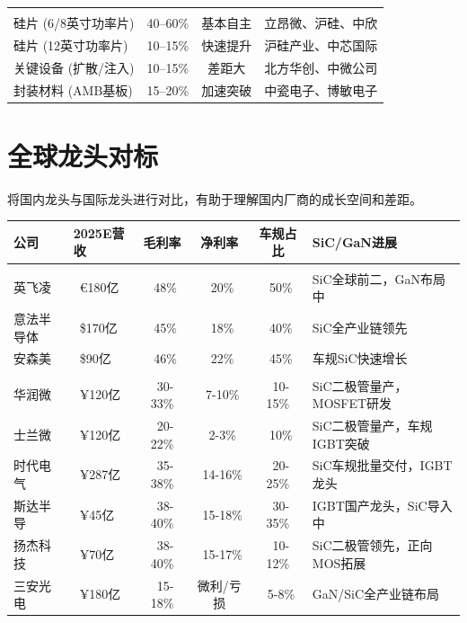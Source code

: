 \begin{exhibitbox}[表 5-2：功率半导体各环节国产化率全景]
\begin{tabularx}{\textwidth}{L{3.5cm} c c X}
\midrule
{}
 \\
硅片 (6/8英寸功率片) & 40–60\% & \textcolor{riskgreen}{基本自主} & 立昂微、沪硅、中欣 \\
硅片 (12英寸功率片) & 10–15\% & \textcolor{riskgreen}{快速提升} & 沪硅产业、中芯国际 \\
关键设备 (扩散/注入) & 10–15\% & \textcolor{riskamber}{差距大} & 北方华创、中微公司 \\
封装材料 (AMB基板) & 15–20\% & \textcolor{riskgreen}{加速突破} & 中瓷电子、博敏电子 \\
\bottomrule
\end{tabularx}
\end{exhibitbox}

\section{全球龙头对标}

将国内龙头与国际龙头进行对比，有助于理解国内厂商的成长空间和差距。

\begin{exhibitbox}[表 5-3：国内外功率半导体龙头对标]
\centering
\small
\setlength{\tabcolsep}{4pt}
\begin{tabularx}{\textwidth}{l L{2.5cm} c c c X}
\toprule
\textbf{公司} & \textbf{2025E营收} & \textbf{毛利率} & \textbf{净利率} & \textbf{车规占比} & \textbf{SiC/GaN进展} \\
\midrule
{}
 \\
英飞凌 & ~€180亿 & ~48\% & ~20\% & ~50\% & SiC全球前二，GaN布局中 \\
意法半导体 & ~\$170亿 & ~45\% & ~18\% & ~40\% & SiC全产业链领先 \\
安森美 & ~\$90亿 & ~46\% & ~22\% & ~45\% & 车规SiC快速增长 \\
\midrule
{}
 \\
华润微 & ~¥120亿 & ~30-33\% & ~7-10\% & ~10-15\% & SiC二极管量产，MOSFET研发 \\
士兰微 & ~¥120亿 & ~20-22\% & ~2-3\% & ~10\% & SiC二极管量产，车规IGBT突破 \\
时代电气 & ~¥287亿 & ~35-38\% & ~14-16\% & ~20-25\% & SiC车规批量交付，IGBT龙头 \\
斯达半导 & ~¥45亿 & ~38-40\% & ~15-18\% & ~30-35\% & IGBT国产龙头，SiC导入中 \\
扬杰科技 & ~¥70亿 & ~38-40\% & ~15-17\% & ~10-12\% & SiC二极管领先，正向MOS拓展 \\
三安光电 & ~¥180亿 & ~15-18\% & 微利/亏损 & ~5-8\% & GaN/SiC全产业链布局 \\
\bottomrule
\end{tabularx}
\end{exhibitbox}

